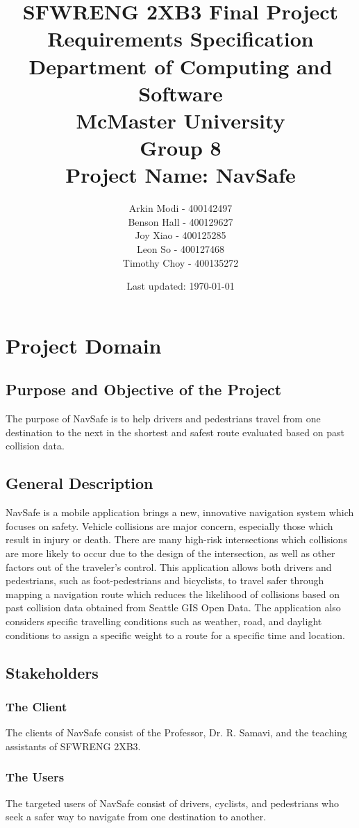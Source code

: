 \documentclass[12pt]{article}
\title{SFWRENG 2XB3 Final Project \\
        \large Requirements Specification\\
        \vspace{1ex}
        \large Department of Computing and Software\\
        \large McMaster University\\
        \vspace{1ex}
        \large Group 8\\
        \large Project Name: NavSafe}
\author{Arkin Modi - 400142497\\
        Benson Hall - 400129627\\
        Joy Xiao - 400125285\\
        Leon So - 400127468\\
        Timothy Choy - 400135272}
\date{Last updated: \today}
\begin{document}
\maketitle
\newpage
\tableofcontents
\newpage

\section{Project Domain}
\subsection{Purpose and Objective of the Project}
The purpose of NavSafe is to help drivers and pedestrians travel from one destination to the next in the shortest and safest route evaluated based on past collision data. 

\subsection{General Description}
NavSafe is a mobile application brings a new, innovative navigation system which focuses on safety. Vehicle collisions are major concern, especially those which result in injury or death. There are many high-risk intersections which collisions are more likely to occur due to the design of the intersection, as well as other factors out of the traveler’s control. This application allows both drivers and pedestrians, such as foot-pedestrians and bicyclists, to travel safer through mapping a navigation route which reduces the likelihood of collisions based on past collision data obtained from Seattle GIS Open Data. The application also considers specific travelling conditions such as weather, road, and daylight conditions to assign a specific weight to a route for a specific time and location.

\subsection{Stakeholders}

    \subsubsection{The Client}
    The clients of NavSafe consist of the Professor, Dr. R. Samavi, and the teaching assistants of SFWRENG 2XB3.
    
    \subsubsection{The Users}
    The targeted users of NavSafe consist of drivers, cyclists, and pedestrians who seek a safer way to navigate from one destination to another.
    
\end{document}
